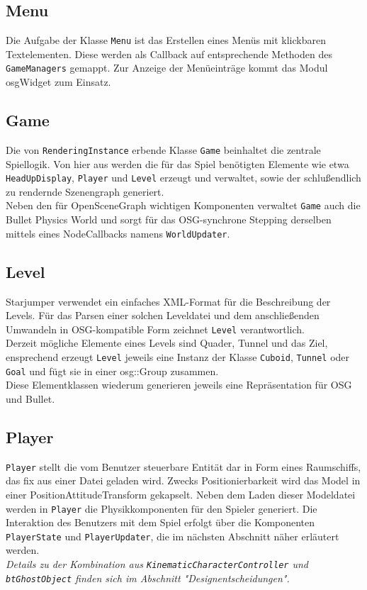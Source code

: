 \documentclass{llncs}
\begin{document}
\subsection{Menu}
Die Aufgabe der Klasse \texttt{Menu} ist das Erstellen eines Men\"us mit klickbaren Textelementen. Diese
werden als Callback auf entsprechende Methoden des \texttt{GameManagers} gemappt. Zur Anzeige der Men\"ueintr\"age
kommt das Modul osgWidget zum Einsatz.

\subsection{Game}
Die von \texttt{RenderingInstance} erbende Klasse \texttt{Game} beinhaltet die zentrale Spiellogik. Von hier aus werden die
f\"ur das Spiel ben\"otigten Elemente wie etwa \texttt{HeadUpDisplay}, \texttt{Player} und \texttt{Level} erzeugt und verwaltet,
sowie der schlu\ss endlich zu rendernde Szenengraph generiert.\\
Neben den f\"ur OpenSceneGraph wichtigen Komponenten verwaltet \texttt{Game} auch die Bullet Physics World und sorgt
f\"ur das OSG-synchrone Stepping derselben mittels eines NodeCallbacks namens \texttt{WorldUpdater}.

\subsection{Level}
Starjumper verwendet ein einfaches XML-Format f\"ur die Beschreibung der Levels. F\"ur das Parsen einer
solchen Leveldatei und dem anschlie\ss enden Umwandeln in OSG-kompatible Form zeichnet \texttt{Level} verantwortlich.\\
Derzeit m\"ogliche Elemente eines Levels sind Quader, Tunnel und das Ziel, ensprechend erzeugt \texttt{Level}
jeweils eine Instanz der Klasse \texttt{Cuboid}, \texttt{Tunnel} oder \texttt{Goal} und f\"ugt sie in einer osg::Group zusammen.\\
Diese Elementklassen wiederum generieren jeweils eine Repr\"asentation f\"ur OSG und Bullet.

\subsection{Player}
\texttt{Player} stellt die vom Benutzer steuerbare Entit\"at dar in Form eines Raumschiffs, das fix aus einer Datei
geladen wird. Zwecks Positionierbarkeit wird das Model in einer PositionAttitudeTransform gekapselt.
Neben dem Laden dieser Modeldatei werden in \texttt{Player} die Physikkomponenten f\"ur den Spieler generiert.
Die Interaktion des Benutzers mit dem Spiel erfolgt \"uber die Komponenten \texttt{PlayerState} und \texttt{PlayerUpdater},
die im n\"achsten Abschnitt n\"aher erl\"autert werden.\\
\textit{Details zu der Kombination aus \texttt{KinematicCharacterController} und \texttt{btGhostObject} finden sich im Abschnitt "Designentscheidungen".}
\end{document}
